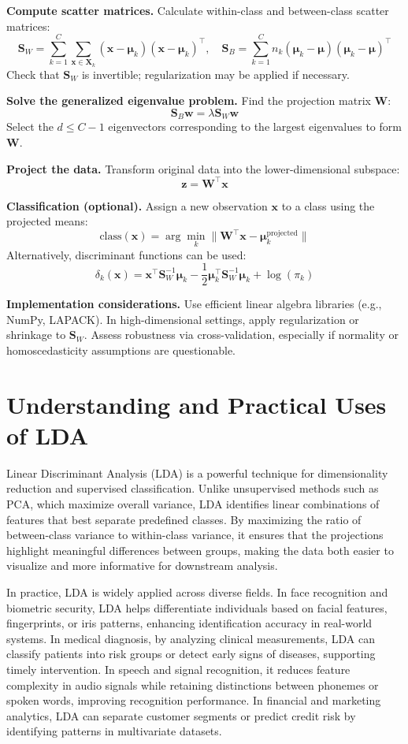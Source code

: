 \documentclass[12pt,a4paper]{article}
\begin{document}
\textbf{Compute scatter matrices.} Calculate within-class and between-class scatter matrices:
\[
\mathbf{S}_W = \sum_{k=1}^C \sum_{\mathbf{x} \in \mathbf{X}_k} (\mathbf{x} - \boldsymbol{\mu}_k)(\mathbf{x} - \boldsymbol{\mu}_k)^\top, \quad
\mathbf{S}_B = \sum_{k=1}^C n_k (\boldsymbol{\mu}_k - \boldsymbol{\mu})(\boldsymbol{\mu}_k - \boldsymbol{\mu})^\top
\]
Check that $\mathbf{S}_W$ is invertible; regularization may be applied if necessary.

\textbf{Solve the generalized eigenvalue problem.} Find the projection matrix $\mathbf{W}$:
\[
\mathbf{S}_B \mathbf{w} = \lambda \mathbf{S}_W \mathbf{w}
\]
Select the $d \le C-1$ eigenvectors corresponding to the largest eigenvalues to form $\mathbf{W}$.

\textbf{Project the data.} Transform original data into the lower-dimensional subspace:
\[
\mathbf{z} = \mathbf{W}^\top \mathbf{x}
\]

\textbf{Classification (optional).} Assign a new observation $\mathbf{x}$ to a class using the projected means:
\[
\text{class}(\mathbf{x}) = \arg\min_k \|\mathbf{W}^\top \mathbf{x} - \boldsymbol{\mu}_k^\text{projected}\|
\]
Alternatively, discriminant functions can be used:
\[
\delta_k(\mathbf{x}) = \mathbf{x}^\top \mathbf{S}_W^{-1} \boldsymbol{\mu}_k - \frac{1}{2} \boldsymbol{\mu}_k^\top \mathbf{S}_W^{-1} \boldsymbol{\mu}_k + \log(\pi_k)
\]

\textbf{Implementation considerations.} Use efficient linear algebra libraries (e.g., NumPy, LAPACK). In high-dimensional settings, apply regularization or shrinkage to $\mathbf{S}_W$. Assess robustness via cross-validation, especially if normality or homoscedasticity assumptions are questionable.

\section{Understanding and Practical Uses of LDA}

Linear Discriminant Analysis (LDA) is a powerful technique for dimensionality reduction and supervised classification. Unlike unsupervised methods such as PCA, which maximize overall variance, LDA identifies linear combinations of features that best separate predefined classes. By maximizing the ratio of between-class variance to within-class variance, it ensures that the projections highlight meaningful differences between groups, making the data both easier to visualize and more informative for downstream analysis.

In practice, LDA is widely applied across diverse fields. In face recognition and biometric security, LDA helps differentiate individuals based on facial features, fingerprints, or iris patterns, enhancing identification accuracy in real-world systems. In medical diagnosis, by analyzing clinical measurements, LDA can classify patients into risk groups or detect early signs of diseases, supporting timely intervention. In speech and signal recognition, it reduces feature complexity in audio signals while retaining distinctions between phonemes or spoken words, improving recognition performance. In financial and marketing analytics, LDA can separate customer segments or predict credit risk by identifying patterns in multivariate datasets.
\end{document}
